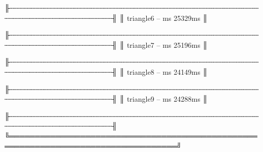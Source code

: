           ╟┄┄┄┄┄┄┄┄┄┄┄┄┄┄┄┄┄┄┄┄┄┄┄┄┄┄┄┄┄┄┄┄┄┄┄┄┄┄┄┄┄┄┄┄┄┄┄┄┄┄┄┄┄┄┄┄┄┄┄┄┄┄┄┄┄┄┄┄┄┄┄┄┄┄┄┄┄┄┄┄┄┄┄╢
          ║ triangle6                       -- ms     25329ms                                 ║
          
          ╟┄┄┄┄┄┄┄┄┄┄┄┄┄┄┄┄┄┄┄┄┄┄┄┄┄┄┄┄┄┄┄┄┄┄┄┄┄┄┄┄┄┄┄┄┄┄┄┄┄┄┄┄┄┄┄┄┄┄┄┄┄┄┄┄┄┄┄┄┄┄┄┄┄┄┄┄┄┄┄┄┄┄┄╢
          ║ triangle7                       -- ms     25196ms                                 ║
          
          ╟┄┄┄┄┄┄┄┄┄┄┄┄┄┄┄┄┄┄┄┄┄┄┄┄┄┄┄┄┄┄┄┄┄┄┄┄┄┄┄┄┄┄┄┄┄┄┄┄┄┄┄┄┄┄┄┄┄┄┄┄┄┄┄┄┄┄┄┄┄┄┄┄┄┄┄┄┄┄┄┄┄┄┄╢
          ║ triangle8                       -- ms     24149ms                                 ║
          
          ╟┄┄┄┄┄┄┄┄┄┄┄┄┄┄┄┄┄┄┄┄┄┄┄┄┄┄┄┄┄┄┄┄┄┄┄┄┄┄┄┄┄┄┄┄┄┄┄┄┄┄┄┄┄┄┄┄┄┄┄┄┄┄┄┄┄┄┄┄┄┄┄┄┄┄┄┄┄┄┄┄┄┄┄╢
          ║ triangle9                       -- ms     24288ms                                 ║
          
          ╟┄┄┄┄┄┄┄┄┄┄┄┄┄┄┄┄┄┄┄┄┄┄┄┄┄┄┄┄┄┄┄┄┄┄┄┄┄┄┄┄┄┄┄┄┄┄┄┄┄┄┄┄┄┄┄┄┄┄┄┄┄┄┄┄┄┄┄┄┄┄┄┄┄┄┄┄┄┄┄┄┄┄┄╢
          ╚═══════════════════════════════════════════════════════════════════════════════════╝
